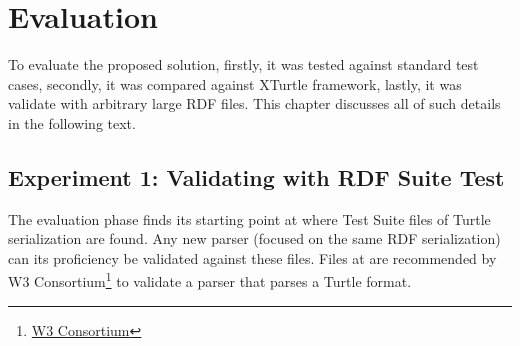 \chapter{Evaluation}
\label{ch:evaluation}
To evaluate the proposed solution, firstly, it was tested against standard test cases, secondly, it was compared against XTurtle framework, lastly, it was validate with arbitrary large RDF files. This chapter discusses all of such details in the following text. 

\section{Experiment 1: Validating with RDF Suite Test}

The evaluation phase finds its starting point at \citealp{TurtleTests:Online} where Test Suite files of Turtle serialization are found. Any new parser (focused on the same RDF serialization) can its proficiency be validated against these files. Files at \cite{TurtleTests:Online} are recommended by W3 Consortium\footnote{\href{https://www.w3.org/}{W3 Consortium}} to validate a parser that parses a Turtle format.  





